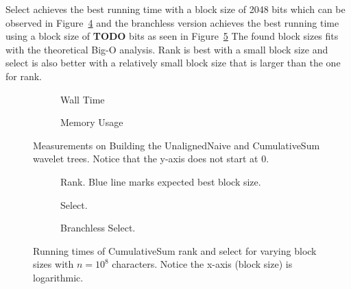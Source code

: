 Select achieves the best running time with a block size of 2048 bits which can be observed in Figure~\ref{fig:CumulativeSumBlockSizeWallTimeSelect} and the branchless version achieves the best running time using a block size of \textbf{TODO} bits as seen in Figure~\ref{fig:CumulativeSumBlockSizeWallTimeSelectBranchless}
The found block sizes fits with the theoretical Big-O analysis.
Rank is best with a small block size and select is also better with a relatively small block size that is larger than the one for rank.


\begin{figure}\tiny
\begin{subfigure}{0.48\textwidth}
	
	\caption{Wall Time}
	\label{fig:CumulativeSumBuildWalltime}
\end{subfigure}
\hfill
\begin{subfigure}{0.48\textwidth}
	
	\caption{Memory Usage}
	\label{fig:CumulativeSumBuildMemoryUsage}
\end{subfigure}
\caption{Measurements on Building the UnalignedNaive and CumulativeSum wavelet trees. Notice that the y-axis does not start at 0.}
\label{fig:CumulativeSumBuild}
\vspace{5mm}
\begin{subfigure}{0.48\textwidth}
	
	\caption{Rank. Blue line marks expected best block size.}
	\label{fig:CumulativeSumBlockSizeWallTimeRank}
\end{subfigure}
\hfill
\begin{subfigure}{0.48\textwidth}
	
	\caption{Select.}
	\label{fig:CumulativeSumBlockSizeWallTimeSelect}
\end{subfigure}

\begin{subfigure}{0.48\textwidth}
	
	\caption{Branchless Select.}
	\label{fig:CumulativeSumBlockSizeWallTimeSelectBranchless}
\end{subfigure}

\caption{Running times of CumulativeSum rank and select for varying block sizes with $n=10^8$ characters. Notice the x-axis (block size) is logarithmic.}
\label{fig:CumulativeSumBlockSize}
\end{figure}

\restoregeometry


